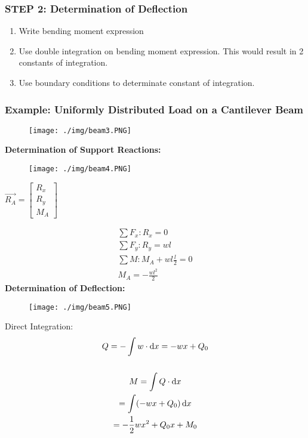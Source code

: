 \subsubsection{STEP 2: Determination of Deflection}
\begin{enumerate}
  \item Write bending moment expression
  \item Use double integration on bending moment expression. This would result in 2 constants of integration.
  \item Use boundary conditions to determinate constant of integration.
\end{enumerate}
\subsubsection{Example: Uniformly Distributed Load on a Cantilever Beam}
\begin{figure}[H]
  \centering
  \texttt{[image: ./img/beam3.PNG]}
\end{figure}
\textbf{Determination of Support Reactions:}
\begin{figure}[H]
  \centering
  \texttt{[image: ./img/beam4.PNG]}
\end{figure}
\begin{center}
  $\vec{R_A} = \left[ \begin{array}{ccc} R_x \\ R_y \\ M_A \end{array}\right]$
\end{center}
\begin{gather}
  \sum F_x: R_x = 0 \\
  \sum F_y: R_y = wl \\
  \sum M: M_A + wl\frac{l}{2} = 0 \\
  M_A = -\frac{wl^2}{2}
\end{gather}
\textbf{Determination of Deflection:}
\begin{figure}[H]
  \centering
  \texttt{[image: ./img/beam5.PNG]}
\end{figure}
Direct Integration:
\begin{gather}
  Q = -\int w \cdot \dif x = -wx + Q_0 \\\\
  M = \int Q \cdot \dif x \\
  = \int (-wx + Q_0)\dif x \\
  = -\frac{1}{2}wx^2 + Q_0x + M_0
\end{gather}
